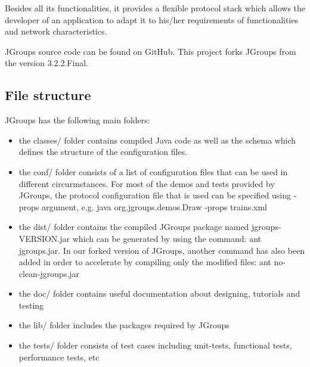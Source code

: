 \documentclass[a4paper,10pt]{report}
\begin{document}
Besides all its functionalities, it provides a flexible protocol stack which allows the developer of an application to adapt it to his/her requirements of functionalities and network characteristics\cite{jgroups}.

JGroups source code can be found on GitHub. This project forks JGroups from the version 3.2.2.Final.

\subsection{File structure}
JGroups has the following main folders:
\begin{itemize}
\item the classes/ folder contains compiled Java code as well as the schema which defines the structure of the configuration files.
\item the conf/ folder consists of a list of configuration files that can be used in different circurmstances. For most of the demos and tests provided by JGroups, the protocol configuration file that is used can be specified using -props argument, e.g. 
java org.jgroups.demos.Draw -props trains.xml
\item the dist/ folder contains the compiled JGroups package named jgroups-VERSION.jar which can be generated by using the command: ant jgroups.jar. In our forked version of JGroups, another command has also been added in order to accelerate by compiling only the modified files: ant no-clean-jgroups.jar
\item the doc/ folder contains useful documentation about designing, tutorials and testing
\item the lib/ folder includes the packages required by JGroups
\item the tests/ folder consists of test cases including unit-tests, functional tests, performance tests, etc
\end{itemize}
\end{document}
